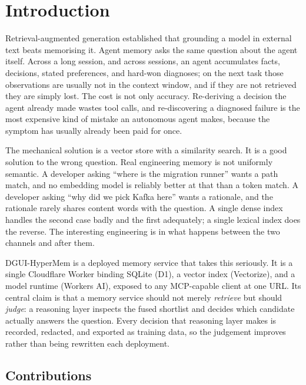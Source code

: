 \documentclass[10pt,twocolumn]{article}
\begin{document}
\section{Introduction}
\label{sec:intro}

Retrieval-augmented generation established that grounding a model in external
text beats memorising it. Agent memory asks the same question about the agent
itself. Across a long session, and across sessions, an agent accumulates facts,
decisions, stated preferences, and hard-won diagnoses; on the next task those
observations are usually not in the context window, and if they are not
retrieved they are simply lost. The cost is not only accuracy. Re-deriving a
decision the agent already made wastes tool calls, and re-discovering a
diagnosed failure is the most expensive kind of mistake an autonomous agent
makes, because the symptom has usually already been paid for once.

The mechanical solution is a vector store with a similarity search. It is a good
solution to the wrong question. Real engineering memory is not uniformly
semantic. A developer asking ``where is the migration runner'' wants a path
match, and no embedding model is reliably better at that than a token match.
A developer asking ``why did we pick Kafka here'' wants a rationale, and the
rationale rarely shares content words with the question. A single dense index
handles the second case badly and the first adequately; a single lexical index
does the reverse. The interesting engineering is in what happens between the two
channels and after them.

DGUI-HyperMem is a deployed memory service that takes this seriously. It is a
single Cloudflare Worker binding SQLite (D1), a vector index (Vectorize), and a
model runtime (Workers AI), exposed to any MCP-capable client\citep{anthropic2025mcp}
at one URL. Its central claim is that a memory service should not merely
\emph{retrieve} but should \emph{judge}: a reasoning layer inspects the fused
shortlist and decides which candidate actually answers the question. Every
decision that reasoning layer makes is recorded, redacted, and exported as
training data, so the judgement improves rather than being rewritten each
deployment.

\subsection{Contributions}
\end{document}
